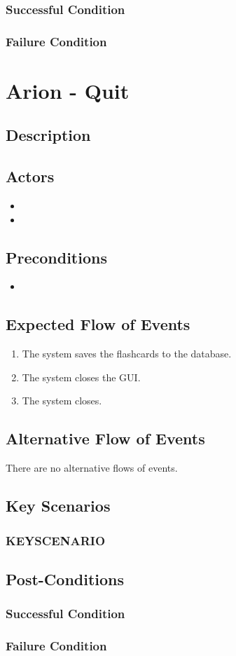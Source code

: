 \documentclass{scrreprt}
\begin{document}
    \subsection{Successful Condition}
    
    \subsection{Failure Condition}


\chapter{Arion - Quit}

\section{Description}

\section{Actors}
\begin{itemize}
    \item 
    \item 
\end{itemize}

\section{Preconditions}
\begin{itemize}
    \item 
\end{itemize}

\section{Expected Flow of Events}
    \begin{enumerate}[1.]
        \item The system saves the flashcards to the database.
        \item The system closes the GUI.
        \item The system closes.
    \end{enumerate}

\section{Alternative Flow of Events}
    There are no alternative flows of events.

\section{Key Scenarios}
    \subsection{KEYSCENARIO}

\section{Post-Conditions}
    \subsection{Successful Condition}
    
    \subsection{Failure Condition}
\end{document}

